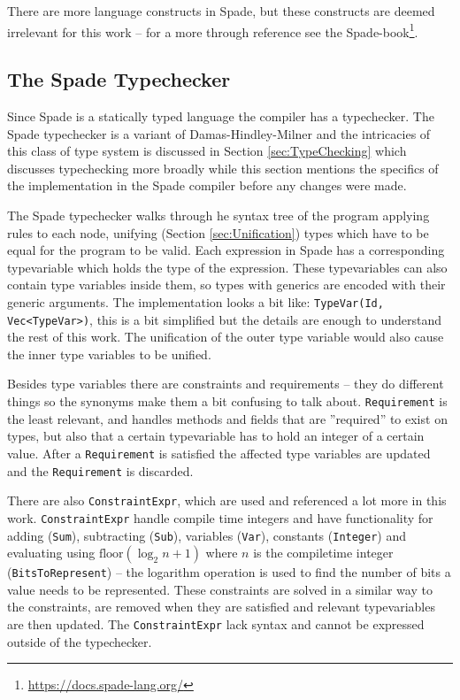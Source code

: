 There are more language constructs in Spade, but these constructs are deemed irrelevant for this work -- for a more through reference see the Spade-book\footnote{\url{https://docs.spade-lang.org/}}.

\subsection{The Spade Typechecker}
\label{sec:TheSpadeTypechecker}
Since Spade is a statically typed language the compiler has a typechecker. The Spade typechecker is a variant of Damas-Hindley-Milner and the intricacies of this class of type system is discussed in Section \ref{sec:TypeChecking} which discusses typechecking more broadly while this section mentions the specifics of the implementation in the Spade compiler before any changes were made.

The Spade typechecker walks through he syntax tree of the program applying rules to each node, unifying (Section \ref{sec:Unification}) types which have to be equal for the program to be valid. Each expression in Spade has a corresponding typevariable which holds the type of the expression. These typevariables can also contain type variables inside them, so types with generics are encoded with their generic arguments. The implementation looks a bit like: \verb+TypeVar(Id, Vec<TypeVar>)+, this is a bit simplified but the details are enough to understand the rest of this work. The unification of the outer type variable would also cause the inner type variables to be unified.

Besides type variables there are constraints and requirements -- they do different things so the synonyms make them a bit confusing to talk about. \verb+Requirement+ is the least relevant, and handles methods and fields that are ''required'' to exist on types, but also that a certain typevariable has to hold an integer of a certain value. After a \verb+Requirement+ is satisfied the affected type variables are updated and the \verb+Requirement+ is discarded.

There are also \verb+ConstraintExpr+, which are used and referenced a lot more in this work. \verb+ConstraintExpr+ handle compile time integers and have functionality for adding (\verb+Sum+), subtracting (\verb+Sub+), variables (\verb+Var+), constants (\verb+Integer+) and evaluating using $\text{floor}(\log_2{n} + 1)$ where $n$ is the compiletime integer (\verb+BitsToRepresent+) -- the logarithm operation is used to find the number of bits a value needs to be represented. These constraints are solved in a similar way to the constraints, are removed when they are satisfied and relevant typevariables are then updated. The \verb+ConstraintExpr+ lack syntax and cannot be expressed outside of the typechecker.

